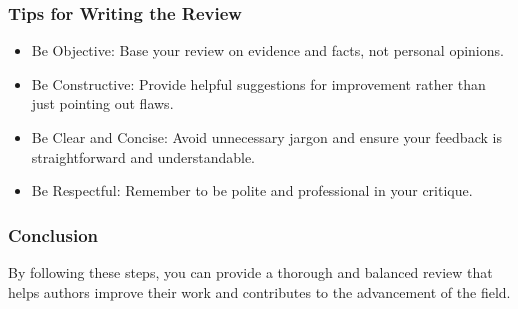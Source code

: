 \documentclass{beamer}
\begin{document}
\begin{frame}
\frametitle{Tips for Writing the Review}
\begin{itemize}
    \item Be Objective: Base your review on evidence and facts, not personal opinions.
    \item Be Constructive: Provide helpful suggestions for improvement rather than just pointing out flaws.
    \item Be Clear and Concise: Avoid unnecessary jargon and ensure your feedback is straightforward and understandable.
    \item Be Respectful: Remember to be polite and professional in your critique.
\end{itemize}
\end{frame}

\begin{frame}
\frametitle{Conclusion}
By following these steps, you can provide a thorough and balanced review that helps authors improve their work and contributes to the advancement of the field.
\end{frame}
\end{document}

